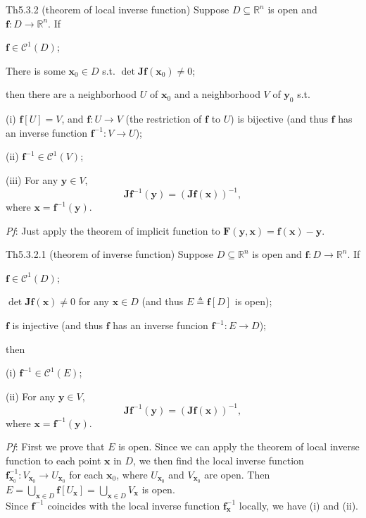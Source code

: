 \documentclass{article}
\begin{document}
\begin{Th}{Th5.3.2 (theorem of local inverse function)}
    Suppose $D\subseteq\mathbb{R}^n$ is open and $\pmb{f}:D\rightarrow\mathbb{R}^n$. If
    \begin{compactenum}
        \item $\pmb{f}\in\mathcal{C}^1(D)$;
        \item There is some $\pmb{x}_0\in D$ s.t. $\det \pmb{Jf}(\pmb{x}_0)\neq 0$;
    \end{compactenum}
    then there are a neighborhood $U$ of $\pmb{x}_0$ and a neighborhood $V$ of $\pmb{y}_0$ s.t.
    \begin{compactenum}
        \item[(i)] $\pmb{f}[U] = V$, and $\pmb{f}: U\rightarrow V$ (the restriction of $\pmb{f}$ to $U$) is bijective (and thus $\pmb{f}$ has an inverse function $\pmb{f}^{-1}: V\rightarrow U$);
        \item[(ii)] $\pmb{f}^{-1}\in\mathcal{C}^1(V)$;
        \item[(iii)] For any $\pmb{y}\in V$,
        $$ \pmb{Jf}^{-1}(\pmb{y}) = \left(\pmb{Jf}(\pmb{x})\right)^{-1}, $$
        where $\pmb{x} = \pmb{f}^{-1}(\pmb{y})$.
    \end{compactenum}
    \tcblower
    \textit{Pf}: Just apply the theorem of implicit function to $\pmb{F}(\pmb{y}, \pmb{x}) = \pmb{f}(\pmb{x})-\pmb{y}$.
\end{Th}

\begin{Th}{Th5.3.2.1 (theorem of inverse function)}
    Suppose $D\subseteq\mathbb{R}^n$ is open and $\pmb{f}:D\rightarrow\mathbb{R}^n$. If
    \begin{compactenum}
        \item $\pmb{f}\in\mathcal{C}^1(D)$;
        \item $\det \pmb{Jf}(\pmb{x})\neq 0$ for any $\pmb{x}\in D$ (and thus $E\triangleq\pmb{f}[D]$ is open);
        \item $\pmb{f}$ is injective (and thus $\pmb{f}$ has an inverse funcion $\pmb{f}^{-1}: E\rightarrow D$);
    \end{compactenum}
    then
    \begin{compactenum}
        \item[(i)] $\pmb{f}^{-1}\in\mathcal{C}^1(E)$;
        \item[(ii)] For any $\pmb{y}\in V$,
        $$ \pmb{Jf}^{-1}(\pmb{y}) = \left(\pmb{Jf}(\pmb{x})\right)^{-1}, $$
        where $\pmb{x} = \pmb{f}^{-1}(\pmb{y})$.
    \end{compactenum}
    \tcblower
    \textit{Pf}: First we prove that $E$ is open. Since we can apply the theorem of local inverse function to each point $\pmb{x}$ in $D$, we then find the local inverse function $\pmb{f}_{\pmb{x}_0}^{-1}: V_{\pmb{x}_0}\rightarrow U_{\pmb{x}_0}$ for each $\pmb{x}_0$, where $U_{\pmb{x}_0}$ and $V_{\pmb{x}_0}$ are open. Then $E = \bigcup_{\pmb{x}\in D}\pmb{f}[U_{\pmb{x}}] = \bigcup_{\pmb{x}\in D} V_{\pmb{x}}$ is open. \\
    Since $\pmb{f}^{-1}$ coincides with the local inverse function $\pmb{f}_{\pmb{x}}^{-1}$ locally, we have (i) and (ii).
\end{Th}
\end{document}
